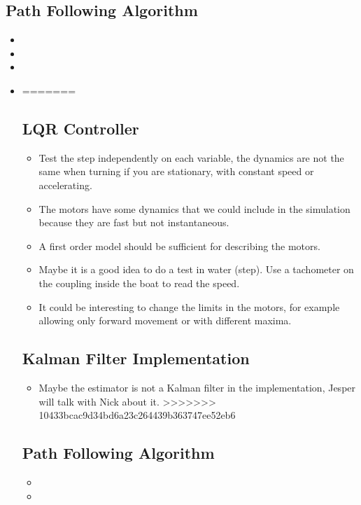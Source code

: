 \subsection{Path Following Algorithm}
\begin{itemize}
	\item 
	\item  
	\item 
	\item 
=======
\subsection{LQR Controller}
\begin{itemize}
	\item Test the step independently on each variable, the dynamics are not the same when turning if you are stationary, with constant speed or accelerating.
    \item The motors have some dynamics that we could include in the simulation because they are fast but not instantaneous.
    \item A first order model should be sufficient for describing the motors.
    \item Maybe it is a good idea to do a test in water (step). Use a tachometer on the coupling inside the boat to read the speed.
    \item It could be interesting to change the limits in the motors, for example allowing only forward movement or with different maxima.
\end{itemize}
\subsection{Kalman Filter Implementation}
\begin{itemize}
	\item Maybe the estimator is not a Kalman filter in the implementation, Jesper will talk with Nick about it.
>>>>>>> 10433bcac9d34bd6a23c264439b363747ee52eb6
\end{itemize}
\subsection{Path Following Algorithm}
\begin{itemize}
<<<<<<< HEAD
	\item 
	\item 
\end{itemize}

\end{itemize}
